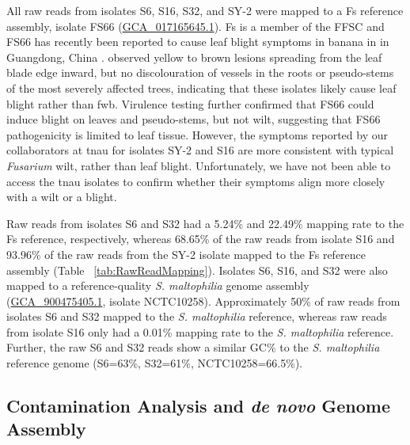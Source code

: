All raw reads from isolates S6, S16, S32, and SY-2 were mapped to a \acf{Fs} reference assembly, isolate FS66 (\href{https://www.ncbi.nlm.nih.gov/datasets/genome/GCA_017165645.1/}{GCA\_017165645.1}). \ac{Fs} is a member of the \acf{FFSC} and FS66 has recently been reported to cause leaf blight symptoms in banana in in Guangdong, China \parencite{Cui2021}. \textcite{Cui2021} observed yellow to brown lesions spreading from the leaf blade edge inward, but no discolouration of vessels in the roots or pseudo-stems of the most severely affected trees, indicating that these isolates likely cause leaf blight rather than \ac{fwb}. Virulence testing further confirmed that FS66 could induce blight on leaves and pseudo-stems, but not wilt, suggesting that FS66 pathogenicity is limited to leaf tissue. However, the symptoms reported by our collaborators at \ac{tnau} for isolates SY-2 and S16 are more consistent with typical \textit{Fusarium} wilt, rather than leaf blight. Unfortunately, we have not been able to access the \ac{tnau} isolates to confirm whether their symptoms align more closely with a wilt or a blight.

Raw reads from isolates S6 and S32 had a 5.24\% and 22.49\% mapping rate to the \ac{Fs} reference, respectively, whereas 68.65\% of the raw reads from isolate S16 and 93.96\% of the raw reads from the SY-2 isolate mapped to the \ac{Fs} reference assembly (Table ~\ref{tab:RawReadMapping}). Isolates S6, S16, and S32 were also mapped to a reference-quality \textit{S. maltophilia} genome assembly (\href{https://www.ncbi.nlm.nih.gov/datasets/genome/GCF_900475405.1/}{GCA\_900475405.1}, isolate NCTC10258). Approximately 50\% of raw reads from isolates S6 and S32 mapped to the \textit{S. maltophilia} reference, whereas raw reads from isolate S16 only had a 0.01\% mapping rate to the \textit{S. maltophilia} reference. Further, the raw S6 and S32 reads show a similar GC\% to the \textit{S. maltophilia} reference genome (S6=63\%, S32=61\%, NCTC10258=66.5\%).

\bigskip


\subsection{Contamination Analysis and \textit{de novo} Genome Assembly}

